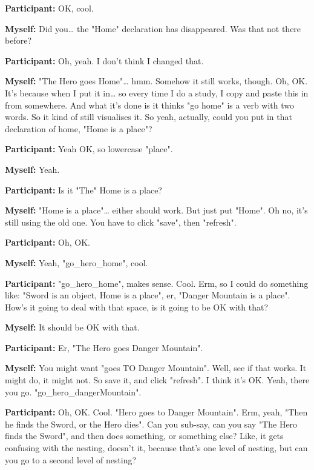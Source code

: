 \documentclass[11pt]{report}
\begin{document}
\begin{linenumbers}
\textbf{Participant:} OK, cool.

\textbf{Myself:} Did you\ldots{} the "Home" declaration has disappeared. Was that not there before?

\textbf{Participant:} Oh, yeah. I don't think I changed that.

\textbf{Myself:} "The Hero goes Home"\ldots{} hmm. Somehow it still works, though. Oh, OK. It's because when I put it in\ldots{} so every time I do a study, I copy and paste this in from somewhere. And what it's done is it thinks "go home" is a verb with two words. So it kind of still visualises it. So yeah, actually, could you put in that declaration of home, "Home is a place"?

\textbf{Participant:} Yeah OK, so lowercase "place".

\textbf{Myself:} Yeah.

\textbf{Participant:} Is it "The" Home is a place?

\textbf{Myself:} "Home is a place"\ldots{} either should work. But just put "Home". Oh no, it's still using the old one. You have to click "save", then "refresh".

\textbf{Participant:} Oh, OK.

\textbf{Myself:} Yeah, "go_hero_home", cool.

\textbf{Participant:} "go_hero_home", makes sense.
Cool. Erm, so I could do something like: "Sword is an object, Home is a place",
er, "Danger Mountain is a place". How's it going to deal with that space, is it
going to be OK with that?

\textbf{Myself:} It should be OK with that.

\textbf{Participant:} Er, "The Hero goes Danger Mountain".

\textbf{Myself:} You might want "goes TO Danger Mountain". Well, see if that works. It might do, it might not. So save it, and click "refresh". I think it's OK. Yeah, there you go. "go_hero_dangerMountain".

\textbf{Participant:} Oh, OK. Cool. "Hero goes to Danger Mountain". Erm, yeah,
"Then he finds the Sword, or the Hero dies". Can you sub-say, can you say "The
Hero finds the Sword", and then does something, or something else? Like, it gets
confusing with the nesting, doesn't it, because that's one level of nesting, but
can you go to a second level of nesting?


\end{linenumbers}
\end{document}
